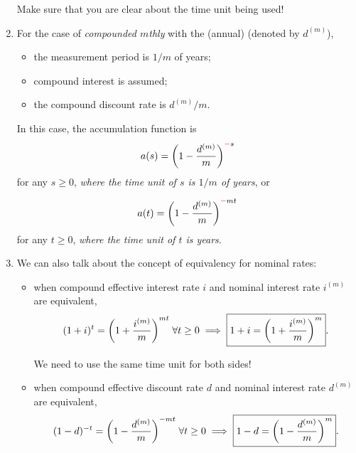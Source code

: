 \begin{enumerate}
\begin{note}
\begin{center}
\end{center}
\end{note}

\begin{warning}
Make sure that you are clear about the time unit being used!
\end{warning}
\item For the case of \emph{compounded \(m\)thly} with the (annual)
 (denoted by \(d^{(m)}\)),
\begin{itemize}
\item the measurement period is \(1/m\) of years;
\item compound interest is assumed;
\item the compound discount rate is \(d^{(m)}/m\).
\end{itemize}
In this case, the accumulation function is
\[
a(s)=\qty(1-\frac{d^{(m)}}{m})^{{\color{magenta}-}s}
\]
for any \(s\ge 0\), \emph{where the time unit of \(s\) is \(1/m\) of years}, or

\[
a(t)=\qty(1-\frac{d^{(m)}}{m})^{{\color{magenta}-}mt}
\]
for any \(t\ge 0\), \emph{where the time unit of \(t\) is years}.
\item \label{it:nominal-effective-equiv-rates-fmlas}
We can also talk about the concept of equivalency for nominal rates:
\begin{itemize}
\item when compound effective interest rate \(i\) and nominal interest rate
\(i^{(m)}\) are equivalent,
\[
(1+i)^{t}=\qty(1+\frac{i^{(m)}}{m})^{mt}\;\forall t\ge 0
\implies
\boxed{1+i=\qty(1+\frac{i^{(m)}}{m})^{m}}.
\]
\begin{warning}
We need to use the same time unit for both sides!
\end{warning}

\item when compound effective discount rate \(d\) and nominal interest rate
\(d^{(m)}\) are equivalent,
\[
(1-d)^{-t}=\qty(1-\frac{d^{(m)}}{m})^{-mt}\;\forall t\ge 0
\implies
\boxed{1-d=\qty(1-\frac{d^{(m)}}{m})^{m}}.
\]
\end{itemize}
\end{enumerate}


